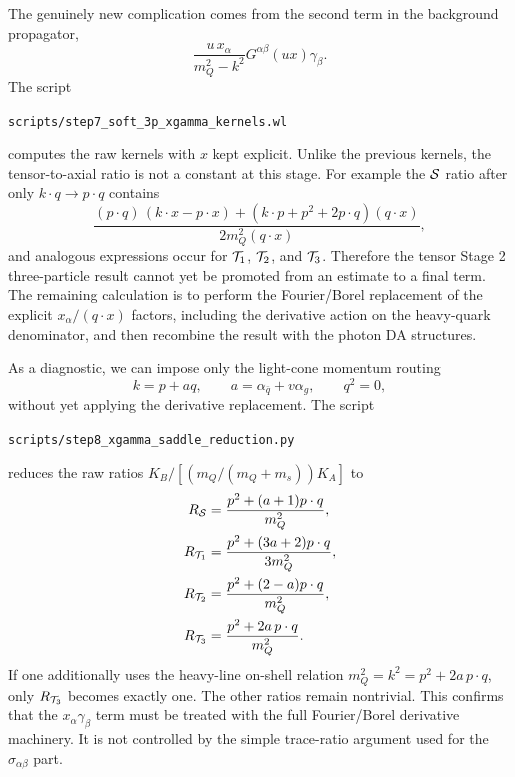 \documentclass[11pt]{article}
\begin{document}
The genuinely new complication comes from the second term in the background
propagator,
\begin{equation}
  \frac{u\,x_\alpha}{m_Q^2-k^2}G^{\alpha\beta}(ux)\gamma_\beta .
\end{equation}
The script
\begin{center}
  \texttt{scripts/step7\_soft\_3p\_xgamma\_kernels.wl}
\end{center}
computes the raw kernels with $x$ kept explicit.  Unlike the previous kernels,
the tensor-to-axial ratio is not a constant at this stage.  For example the
${\cal S}$ ratio after only $k\cdot q\to p\cdot q$ contains
\begin{equation}
  \frac{
    (p\cdot q)\,(k\cdot x-p\cdot x)
    +(k\cdot p+p^2+2p\cdot q)(q\cdot x)
  }{
    2m_Q^2(q\cdot x)
  },
\end{equation}
and analogous expressions occur for ${\cal T}_1$, ${\cal T}_2$, and
${\cal T}_3$.  Therefore the tensor Stage 2 three-particle result cannot yet
be promoted from an estimate to a final term.  The remaining calculation is to
perform the Fourier/Borel replacement of the explicit $x_\alpha/(q\cdot x)$
factors, including the derivative action on the heavy-quark denominator, and
then recombine the result with the photon DA structures.

As a diagnostic, we can impose only the light-cone momentum routing
\begin{equation}
  k=p+a q,\qquad a=\alpha_{\bar q}+v\alpha_g,\qquad q^2=0,
\end{equation}
without yet applying the derivative replacement.  The script
\begin{center}
  \texttt{scripts/step8\_xgamma\_saddle\_reduction.py}
\end{center}
reduces the raw ratios $K_B/[(m_Q/(m_Q+m_s))K_A]$ to
\begin{align}
  R_{\cal S}
  &=
  \frac{p^2+(a+1)p\cdot q}{m_Q^2},\\
  R_{{\cal T}_1}
  &=
  \frac{p^2+(3a+2)p\cdot q}{3m_Q^2},\\
  R_{{\cal T}_2}
  &=
  \frac{p^2+(2-a)p\cdot q}{m_Q^2},\\
  R_{{\cal T}_3}
  &=
  \frac{p^2+2a\,p\cdot q}{m_Q^2}.
\end{align}
If one additionally uses the heavy-line on-shell relation
$m_Q^2=k^2=p^2+2a\,p\cdot q$, only $R_{{\cal T}_3}$ becomes exactly one.
The other ratios remain nontrivial.  This confirms that the
$x_\alpha\gamma_\beta$ term must be treated with the full Fourier/Borel
derivative machinery.  It is not controlled by the simple trace-ratio argument
used for the $\sigma_{\alpha\beta}$ part.
\end{document}
